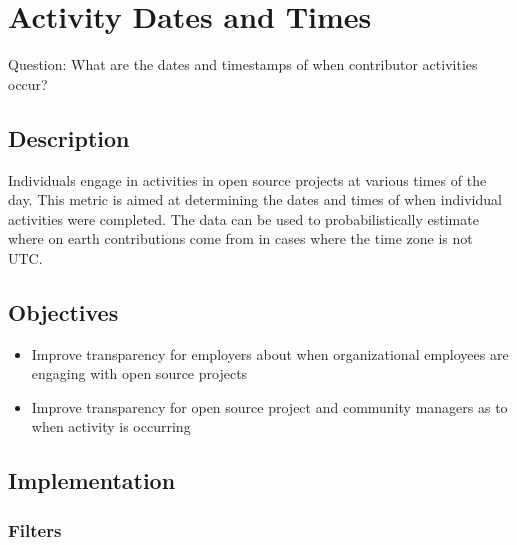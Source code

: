 \hypertarget{activity-dates-and-times}{%
\section{Activity Dates and Times}\label{activity-dates-and-times}}

Question: What are the dates and timestamps of when contributor
activities occur?

\hypertarget{description}{%
\subsection{Description}\label{description}}

Individuals engage in activities in open source projects at various
times of the day. This metric is aimed at determining the dates and
times of when individual activities were completed. The data can be used
to probabilistically estimate where on earth contributions come from in
cases where the time zone is not UTC.

\hypertarget{objectives}{%
\subsection{Objectives}\label{objectives}}

\begin{itemize}
\tightlist
\item
  Improve transparency for employers about when organizational employees
  are engaging with open source projects
\item
  Improve transparency for open source project and community managers as
  to when activity is occurring
\end{itemize}

\hypertarget{implementation}{%
\subsection{Implementation}\label{implementation}}

\hypertarget{filters}{%
\subsubsection{Filters}\label{filters}}

